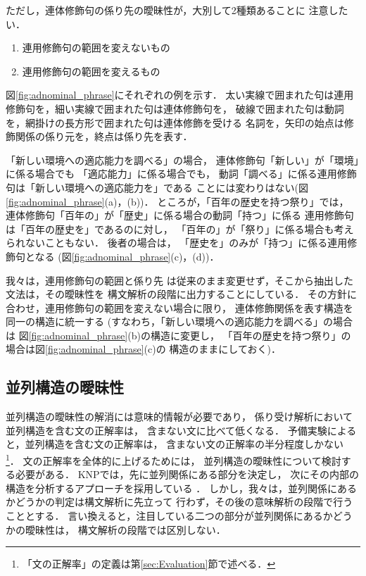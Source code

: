 ただし，連体修飾句の係り先の曖昧性が，大別して2種類あることに
注意したい．
\begin{enumerate}
\item 連用修飾句の範囲を変えないもの
\item 連用修飾句の範囲を変えるもの
\end{enumerate}
図\ref{fig:adnominal_phrase}にそれぞれの例を示す．
太い実線で囲まれた句は連用修飾句を，細い実線で囲まれた句は連体修飾句を，
破線で囲まれた句は動詞を，網掛けの長方形で囲まれた句は連体修飾を受ける
名詞を，矢印の始点は修飾関係の係り元を，終点は係り先を表す．

「新しい環境への適応能力を調べる」の場合，
連体修飾句「新しい」が「環境」に係る場合でも
「適応能力」に係る場合でも，
動詞「調べる」に係る連用修飾句は「新しい環境への適応能力を」である
ことには変わりはない(図\ref{fig:adnominal_phrase}(a)，(b))．
ところが，「百年の歴史を持つ祭り」では，
連体修飾句「百年の」が「歴史」に係る場合の動詞「持つ」に係る
連用修飾句は「百年の歴史を」であるのに対し，
「百年の」が「祭り」に係る場合も考えられないこともない．
後者の場合は，
「歴史を」のみが「持つ」に係る連用修飾句となる
(図\ref{fig:adnominal_phrase}(c)，(d))．

我々は，連用修飾句の範囲と係り先
は従来のまま変更せず，そこから抽出した文法は，その曖昧性を
構文解析の段階に出力することにしている．
その方針に合わせ，連用修飾句の範囲を変えない場合に限り，
連体修飾関係を表す構造を同一の構造に統一する
(すなわち，「新しい環境への適応能力を調べる」の場合は
図\ref{fig:adnominal_phrase}(b)の構造に変更し，
「百年の歴史を持つ祭り」の場合は図\ref{fig:adnominal_phrase}(c)の
構造のままにしておく)．


\subsection{並列構造の曖昧性}

並列構造の曖昧性の解消には意味的情報が必要であり，
係り受け解析において並列構造を含む文の正解率は，
含まない文に比べて低くなる．
予備実験によると，並列構造を含む文の正解率は，
含まない文の正解率の半分程度しかない\cite{noro:2003}
\footnote{「文の正解率」の定義は第\ref{sec:Evaluation}節で述べる．}．
文の正解率を全体的に上げるためには，
並列構造の曖昧性について検討する必要がある．
KNP\cite{kurohashi:1998}では，先に並列関係にある部分を決定し，
次にその内部の構造を分析するアプローチを採用している
\cite{kurohashi:1992}．
しかし，我々は，並列関係にあるかどうかの判定は構文解析に先立って
行わず，その後の意味解析の段階で行うこととする．
言い換えると，注目している二つの部分が並列関係にあるかどうかの曖昧性は，
構文解析の段階では区別しない．

